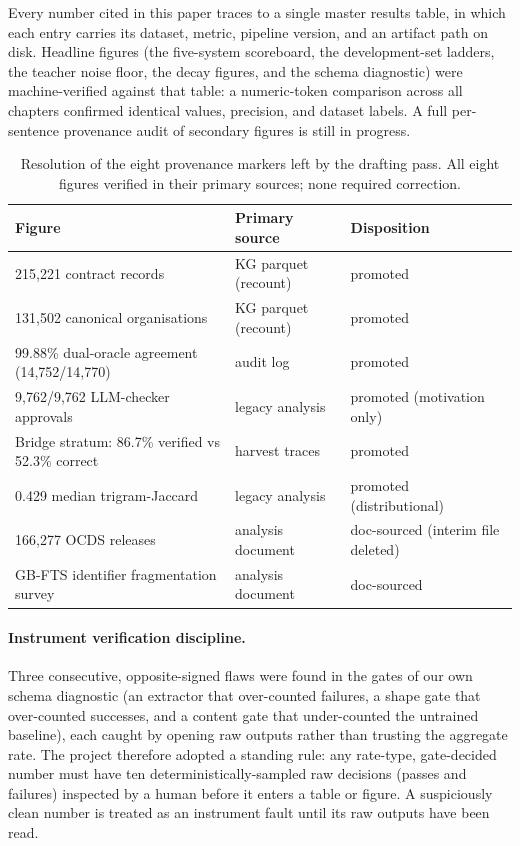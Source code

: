 \documentclass[10pt]{article} %
\begin{document}
Every number cited in this paper traces to a single master results table, in which each entry
carries its dataset, metric, pipeline version, and an artifact path on disk. Headline figures
(the five-system scoreboard, the development-set ladders, the teacher noise floor, the decay
figures, and the schema diagnostic) were machine-verified against that table: a numeric-token
comparison across all chapters confirmed identical values, precision, and dataset labels. A full
per-sentence provenance audit of secondary figures is still in progress.

\begin{table}[h]
\centering\small
\caption{Resolution of the eight provenance markers left by the drafting pass. All eight figures
verified in their primary sources; none required correction.}
\label{tab:audit}
\begin{tabular}{lll}
\toprule
Figure & Primary source & Disposition \\
\midrule
215{,}221 contract records & KG parquet (recount) & promoted \\
131{,}502 canonical organisations & KG parquet (recount) & promoted \\
99.88\% dual-oracle agreement (14{,}752/14{,}770) & audit log & promoted \\
9{,}762/9{,}762 LLM-checker approvals & legacy analysis & promoted (motivation only) \\
Bridge stratum: 86.7\% verified vs 52.3\% correct & harvest traces & promoted \\
0.429 median trigram-Jaccard & legacy analysis & promoted (distributional) \\
166{,}277 OCDS releases & analysis document & doc-sourced (interim file deleted) \\
GB-FTS identifier fragmentation survey & analysis document & doc-sourced \\
\bottomrule
\end{tabular}
\end{table}

\paragraph{Instrument verification discipline.} Three consecutive, opposite-signed flaws were
found in the gates of our own schema diagnostic (an extractor that over-counted failures, a
shape gate that over-counted successes, and a content gate that under-counted the untrained
baseline), each caught by opening raw outputs rather than trusting the aggregate rate. The
project therefore adopted a standing rule: any rate-type, gate-decided number must have ten
deterministically-sampled raw decisions (passes and failures) inspected by a human before it
enters a table or figure. A suspiciously clean number is treated as an instrument fault until
its raw outputs have been read.
\end{document}
